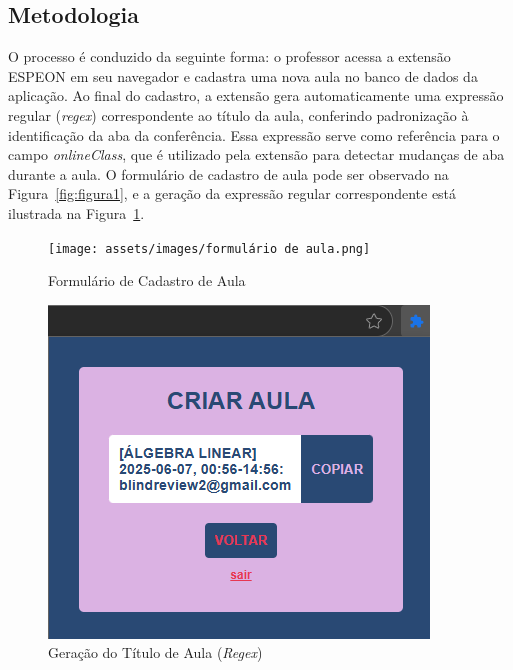 \subsection{Metodologia}
O processo é conduzido da seguinte forma: o professor acessa a extensão ESPEON em seu navegador e cadastra uma nova aula no banco de dados da aplicação. Ao final do cadastro, a extensão gera automaticamente uma expressão regular (\textit{regex}) correspondente ao título da aula, conferindo padronização à identificação da aba da conferência. Essa expressão serve como referência para o campo \textit{onlineClass}, que é utilizado pela extensão para detectar mudanças de aba durante a aula. O formulário de cadastro de aula pode ser observado na Figura~\ref{fig:figura1}, e a geração da expressão regular correspondente está ilustrada na Figura~\ref{fig:figura2}.

\begin{figure}[H]
    \centering
    \begin{minipage}{0.48\textwidth}
        \centering
        \texttt{[image: assets/images/formulário de aula.png]}
        \caption{Formulário de Cadastro de Aula}
        \label{fig:figura1}
    \end{minipage}\hfill
    \begin{minipage}{0.48\textwidth}
        \centering
        \includegraphics[width=.9\textwidth]{assets/images/aula criada.png}
        \caption{Geração do Título de Aula (\textit{Regex})}
        \label{fig:figura2}
    \end{minipage}
\end{figure}

